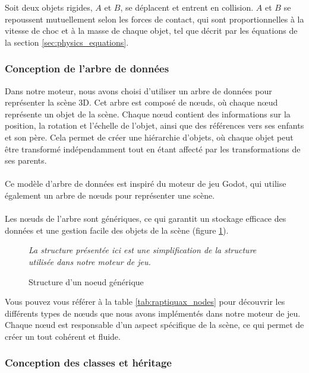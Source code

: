     \newpage

    Soit deux objets rigides, \( A \) et \( B \), se déplacent et entrent
    en collision. \( A \) et \( B \) se repoussent mutuellement selon les
    forces de contact, qui sont proportionnelles à la vitesse de choc et à la
    masse de chaque objet, tel que décrit par les équations de la section \ref{sec:physics_equations}.

\subsubsection{Conception de l'arbre de données}

    Dans notre moteur, nous avons choisi d'utiliser un arbre de données
    pour représenter la scène 3D. Cet arbre est composé de n\oe{}uds, où
    chaque n\oe{}ud représente un objet de la scène. Chaque n\oe{}ud
    contient des informations sur la position, la rotation et l'échelle de
    l'objet, ainsi que des références vers ses enfants et son père.
    Cela permet de créer une hiérarchie d'objets, où chaque objet peut
    être transformé indépendamment tout en étant affecté par les
    transformations de ses parents.
    \\ \\
    Ce modèle d'arbre de données est inspiré du moteur de jeu Godot, qui
    utilise également un arbre de n\oe{}uds pour représenter une scène.
    \\ \\
    Les n\oe{}uds de l'arbre sont génériques, ce qui garantit un stockage
    efficace des données et une gestion facile des objets de la scène (figure \ref{fig:node_structure}).

    \begin{figure}[h]
        \centering
        
        \emph{La structure présentée ici est une simplification de la structure utilisée dans notre moteur de jeu.}
        \caption{Structure d'un noeud générique}
        \label{fig:node_structure}
    \end{figure}

    Vous pouvez vous référer à la table \ref{tab:raptiquax_nodes} pour découvrir
    les différents types de n\oe{}uds que nous avons implémentés dans notre
    moteur de jeu. Chaque n\oe{}ud est responsable d'un aspect spécifique de
    la scène, ce qui permet de créer un tout cohérent et fluide.


\subsubsection{Conception des classes et héritage}

